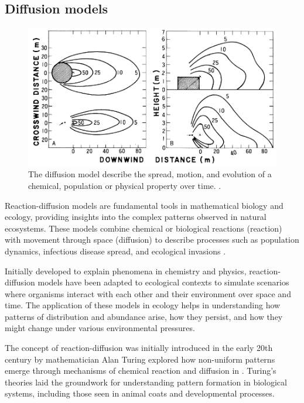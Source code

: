 

\subsection{Diffusion models}

\begin{figure}[H]
    \centering
    \includegraphics[width= .8 \linewidth]{diffusion-example-Okubo2001.png}
    \caption{The diffusion model describe the spread, motion, and evolution of a chemical, population or physical property over time. \cite{Okubo2001}.}
    \label{fig:diffusion-model-teaser}    
\end{figure}

Reaction-diffusion models are fundamental tools in mathematical biology and ecology, providing insights into the complex patterns observed in natural ecosystems. These models combine chemical or biological reactions (reaction) with movement through space (diffusion) to describe processes such as population dynamics, infectious disease spread, and ecological invasions \cite{Cosner2008}.

Initially developed to explain phenomena in chemistry and physics, reaction-diffusion models have been adapted to ecological contexts to simulate scenarios where organisms interact with each other and their environment over space and time. The application of these models in ecology helps in understanding how patterns of distribution and abundance arise, how they persist, and how they might change under various environmental pressures.

The concept of reaction-diffusion was initially introduced in the early 20th century by mathematician Alan Turing explored how non-uniform patterns emerge through mechanisms of chemical reaction and diffusion in \citep{Turing1952}. Turing's theories laid the groundwork for understanding pattern formation in biological systems, including those seen in animal coats and developmental processes.

